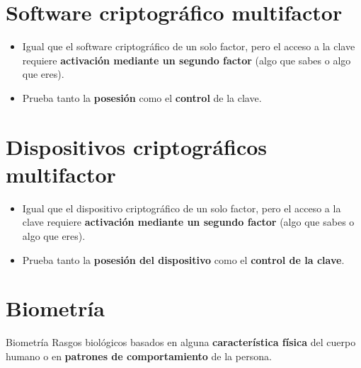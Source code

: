 \documentclass[11pt,a4paper]{report}
\begin{document}
\section{Software criptográfico multifactor}
 
\begin{itemize}
  \item Igual que el software criptográfico de un solo factor, pero el acceso a la clave requiere \textbf{activación mediante un segundo factor} (algo que sabes o algo que eres).
  \item Prueba tanto la \textbf{posesión} como el \textbf{control} de la clave.
\end{itemize}
 
\section{Dispositivos criptográficos multifactor}
 
\begin{itemize}
  \item Igual que el dispositivo criptográfico de un solo factor, pero el acceso a la clave requiere \textbf{activación mediante un segundo factor} (algo que sabes o algo que eres).
  \item Prueba tanto la \textbf{posesión del dispositivo} como el \textbf{control de la clave}.
\end{itemize}
 
\section{Biometría}
 
\begin{definicion}{Biometría}
Rasgos biológicos basados en alguna \textbf{característica física} del cuerpo humano o en \textbf{patrones de comportamiento} de la persona.
\end{definicion}
 
\end{document}
